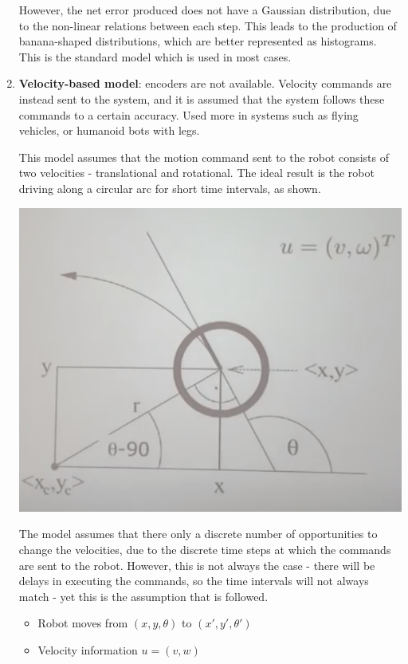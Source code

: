 \documentclass[a4paper]{article}
\begin{document}
\begin{enumerate}
    However, the net error produced does not have a Gaussian distribution, due to the non-linear relations between each step. This leads to the production of banana-shaped distributions, which are better represented as histograms. This is the standard model which is used in most cases.
    
    \item \textbf{Velocity-based model}: encoders are not available. Velocity commands are instead sent to the system, and it is assumed that the system follows these commands to a certain accuracy. Used more in systems such as flying vehicles, or humanoid bots with legs.
    
    This model assumes that the motion command sent to the robot consists of two velocities - translational and rotational. The ideal result is the robot driving along a circular arc for short time intervals, as shown.
    
    \begin{center}
    \includegraphics[scale=0.5]{velmodel}
    \end{center}
    
    The model assumes that there only a discrete number of opportunities to change the velocities, due to the discrete time steps at which the commands are sent to the robot. However, this is not always the case - there will be delays in executing the commands, so the time intervals will not always match - yet this is the assumption that is followed.
    
    \begin{itemize}
        \item Robot moves from $(x, y, \theta)$ to $(x', y', \theta ')$
        \item Velocity information $u = (v, w)$
    \end{itemize}
    

\end{enumerate}
\end{document}
